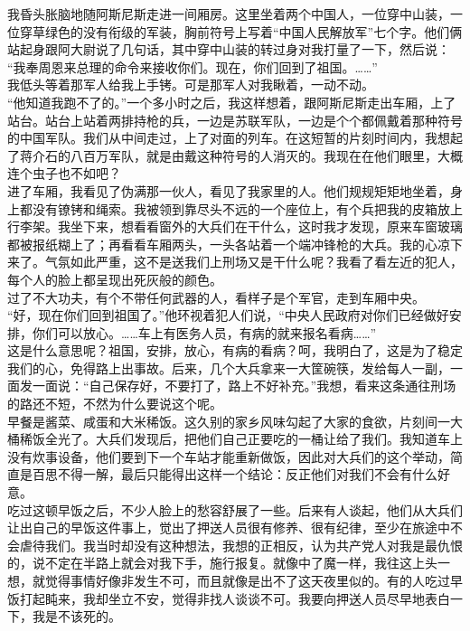 我昏头胀脑地随阿斯尼斯走进一间厢房。这里坐着两个中国人，一位穿中山装，一位穿草绿色的没有衔级的军装，胸前符号上写着“中国人民解放军”七个字。他们俩站起身跟阿大尉说了几句话，其中穿中山装的转过身对我打量了一下，然后说：\\

“我奉周恩来总理的命令来接收你们。现在，你们回到了祖国。……”\\

我低头等着那军人给我上手铐。可是那军人对我瞅着，一动不动。\\

“他知道我跑不了的。”一个多小时之后，我这样想着，跟阿斯尼斯走出车厢，上了站台。站台上站着两排持枪的兵，一边是苏联军队，一边是个个都佩戴着那种符号的中国军队。我们从中间走过，上了对面的列车。在这短暂的片刻时间内，我想起了蒋介石的八百万军队，就是由戴这种符号的人消灭的。我现在在他们眼里，大概连个虫子也不如吧？\\

进了车厢，我看见了伪满那一伙人，看见了我家里的人。他们规规矩矩地坐着，身上都没有镣铐和绳索。我被领到靠尽头不远的一个座位上，有个兵把我的皮箱放上行李架。我坐下来，想看看窗外的大兵们在干什么，这时我才发现，原来车窗玻璃都被报纸糊上了；再看看车厢两头，一头各站着一个端冲锋枪的大兵。我的心凉下来了。气氛如此严重，这不是送我们上刑场又是干什么呢？我看了看左近的犯人，每个人的脸上都呈现出死灰般的颜色。\\

过了不大功夫，有个不带任何武器的人，看样子是个军官，走到车厢中央。\\

“好，现在你们回到祖国了。”他环视着犯人们说，“中央人民政府对你们已经做好安排，你们可以放心。……车上有医务人员，有病的就来报名看病……”\\

这是什么意思呢？祖国，安排，放心，有病的看病？呵，我明白了，这是为了稳定我们的心，免得路上出事故。后来，几个大兵拿来一大筐碗筷，发给每人一副，一面发一面说：“自己保存好，不要打了，路上不好补充。”我想，看来这条通往刑场的路还不短，不然为什么要说这个呢。\\

早餐是酱菜、咸蛋和大米稀饭。这久别的家乡风味勾起了大家的食欲，片刻间一大桶稀饭全光了。大兵们发现后，把他们自己正要吃的一桶让给了我们。我知道车上没有炊事设备，他们要到下一个车站才能重新做饭，因此对大兵们的这个举动，简直是百思不得一解，最后只能得出这样一个结论：反正他们对我们不会有什么好意。\\

吃过这顿早饭之后，不少人脸上的愁容舒展了一些。后来有人谈起，他们从大兵们让出自己的早饭这件事上，觉出了押送人员很有修养、很有纪律，至少在旅途中不会虐待我们。我当时却没有这种想法，我想的正相反，认为共产党人对我是最仇恨的，说不定在半路上就会对我下手，施行报复。就像中了魔一样，我往这上头一想，就觉得事情好像非发生不可，而且就像是出不了这天夜里似的。有的人吃过早饭打起盹来，我却坐立不安，觉得非找人谈谈不可。我要向押送人员尽早地表白一下，我是不该死的。\\

